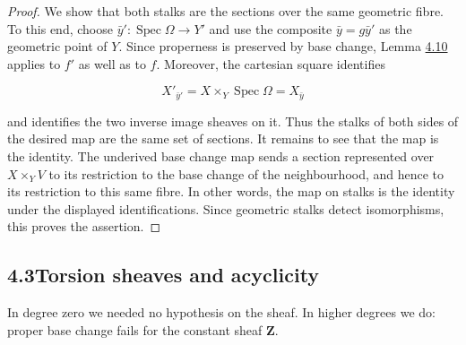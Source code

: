 \documentclass[11pt]{article}
\begin{document}
\begin{proof}[{Proof}]\label{bp315}%
We show that both stalks are the sections over the same geometric fibre. To this end, choose \(\bar y':\operatorname{Spec}\Omega\to Y'\) and use the composite \(\bar y=g\bar y'\) as the geometric point of \(Y\). Since properness is preserved by base change, Lemma \hyperref[bp312]{4.10} applies to \(f'\) as well as to \(f\). Moreover, the cartesian square identifies

\[
X'_{\bar y'}=X\times_Y\operatorname{Spec}\Omega=X_{\bar y}
\]

and identifies the two inverse image sheaves on it. Thus the stalks of both sides of the desired map are the same set of sections. It remains to see that the map is the identity. The underived base change map sends a section represented over \(X\times_YV\) to its restriction to the base change of the neighbourhood, and hence to its restriction to this same fibre. In other words, the map on stalks is the identity under the displayed identifications. Since geometric stalks detect isomorphisms, this proves the assertion.
\end{proof}


\subsection*{\texorpdfstring{4.3\quad Torsion sheaves and acyclicity}{4.3 Torsion sheaves and acyclicity}}
\label{bp316}%
\label{bp317}%
In degree zero we needed no hypothesis on the sheaf. In higher degrees we do: proper base change fails for the constant sheaf \(\mathbf Z\).
\end{document}
